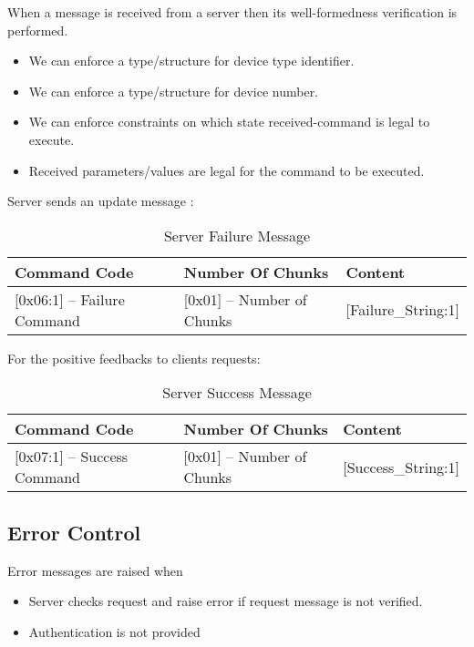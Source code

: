 When a message is received from a server then its well-formedness verification is performed.
\begin{itemize}
\item  We can enforce a type/structure for device type identifier.
\item We can enforce a type/structure for device number.
\item  We can enforce constraints on which state received-command is legal to execute.
\item Received parameters/values are legal for the command to be executed. 
\end{itemize}

Server sends an update message :

\begin{table}[ht!]
  \centering
  \begin{tabular}{l l l}
\hline
\textbf{Command Code} & \textbf{Number Of Chunks} & \textbf{Content}\\
\hline
\hline
\textsf{[0x06:1]} -- Failure Command  & \textsf{[0x01]} -- Number of Chunks & \textsf{[Failure\_String:1]} \\
\hline
\hline
\end{tabular}
\caption{Server Failure Message}
\end{table}


For the positive feedbacks to clients requests:

\begin{table}[ht!]
  \centering
\begin{tabular}{l l l}
\hline
\textbf{Command Code}  & \textbf{Number Of Chunks} & \textbf{Content}\\
\hline
\hline
\textsf{[0x07:1]} -- Success Command & \textsf{[0x01]} -- Number of Chunks & \textsf{[Success\_String:1]} \\
\hline
\hline
\end{tabular}
\caption{Server Success Message}
\end{table}


\subsection{Error Control}
\label{sec:pdus:err}
Error messages are raised when
\begin{itemize}
\item Server checks request and raise error if request message is not verified.
\item Authentication is not provided
  \end{itemize}
